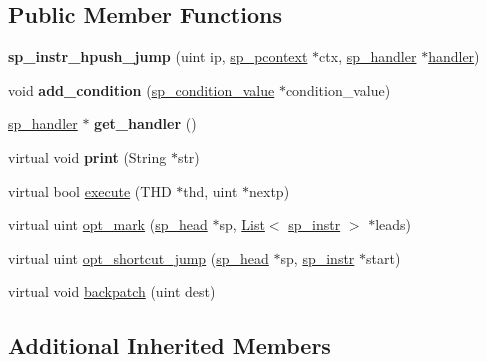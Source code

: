 \subsection*{Public Member Functions}
\begin{DoxyCompactItemize}
\item 
\mbox{\label{classsp__instr__hpush__jump_a01a4103c7a043564bbdef673078930f6}} 
{\bfseries sp\+\_\+instr\+\_\+hpush\+\_\+jump} (uint ip, \mbox{\hyperlink{classsp__pcontext}{sp\+\_\+pcontext}} $\ast$ctx, \mbox{\hyperlink{classsp__handler}{sp\+\_\+handler}} $\ast$\mbox{\hyperlink{classhandler}{handler}})
\item 
\mbox{\label{classsp__instr__hpush__jump_ab3af9d256a99e54a0b386f4e0af54c50}} 
void {\bfseries add\+\_\+condition} (\mbox{\hyperlink{classsp__condition__value}{sp\+\_\+condition\+\_\+value}} $\ast$condition\+\_\+value)
\item 
\mbox{\label{classsp__instr__hpush__jump_abd911a9e5d37c6cfff874ab2605f2271}} 
\mbox{\hyperlink{classsp__handler}{sp\+\_\+handler}} $\ast$ {\bfseries get\+\_\+handler} ()
\item 
\mbox{\label{classsp__instr__hpush__jump_a4351e7138190fa2255287d42c4947f20}} 
virtual void {\bfseries print} (String $\ast$str)
\item 
virtual bool \mbox{\hyperlink{classsp__instr__hpush__jump_a5ecf945e7fa0e56f22447a64a6fa545e}{execute}} (T\+HD $\ast$thd, uint $\ast$nextp)
\item 
virtual uint \mbox{\hyperlink{classsp__instr__hpush__jump_affb8b5892ac7dd82bcbb99183f6bc6e3}{opt\+\_\+mark}} (\mbox{\hyperlink{classsp__head}{sp\+\_\+head}} $\ast$sp, \mbox{\hyperlink{classList}{List}}$<$ \mbox{\hyperlink{classsp__instr}{sp\+\_\+instr}} $>$ $\ast$leads)
\item 
virtual uint \mbox{\hyperlink{classsp__instr__hpush__jump_a7b00002d8497221812af5f222a2a1732}{opt\+\_\+shortcut\+\_\+jump}} (\mbox{\hyperlink{classsp__head}{sp\+\_\+head}} $\ast$sp, \mbox{\hyperlink{classsp__instr}{sp\+\_\+instr}} $\ast$start)
\item 
virtual void \mbox{\hyperlink{classsp__instr__hpush__jump_addad7cbed316eb02d7238e07e092c558}{backpatch}} (uint dest)
\end{DoxyCompactItemize}
\subsection*{Additional Inherited Members}



